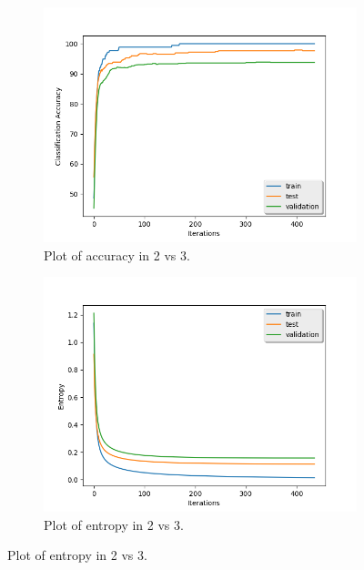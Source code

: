 \documentclass{article} %
\begin{document}
\begin{figure}[H]
\centering
\begin{subfigure}{.5\textwidth}
	\centering
	\includegraphics[width=1.05\linewidth]{plt_2vs3_accuracy.png}
	\caption{Plot of accuracy in 2 vs 3.}
\end{subfigure}%
\begin{subfigure}{.5\textwidth}
	\centering
	\includegraphics[width=1.05\linewidth]{plt_2vs3_losses.png}
	\caption{Plot of entropy in 2 vs 3.}
   \end{subfigure}
\end{figure}
\end{document}
